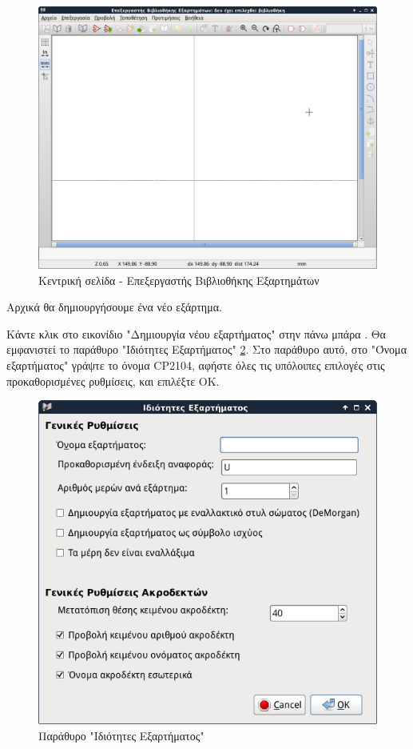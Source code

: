 \documentclass[a4paper]{article}
\begin{document}
\begin{figure}
  \begin{center}
    \includegraphics[width=.9\textwidth]{img/libed-main-window.png}
    \caption{Kεντρική σελίδα - Επεξεργαστής Βιβλιοθήκης Εξαρτημάτων}
    \label{fig:libed-main-window}
  \end{center}
\end{figure}

Αρχικά θα δημιουργήσουμε ένα νέο εξάρτημα.

Κάντε κλικ στο εικονίδιο "Δημιουργία νέου εξαρτήματος" στην πάνω μπάρα %
. Θα εμφανιστεί το παράθυρο "Ιδιότητες Εξαρτήματος" \ref{fig:eesch-dial-compprop}. Στο παράθυρο αυτό, στο "Όνομα εξαρτήματος" γράψτε το όνομα \textenglish{CP2104}, αφήστε όλες τις υπόλοιπες επιλογές στις προκαθορισμένες ρυθμίσεις, και επιλέξτε ΟΚ.

\begin{figure}
  \begin{center}
    \includegraphics[width=.9\textwidth]{img/eesch-dial-compprop.png}
    \caption{Παράθυρο "Ιδιότητες Εξαρτήματος"}
    \label{fig:eesch-dial-compprop}
  \end{center}
\end{figure}
\end{document}
